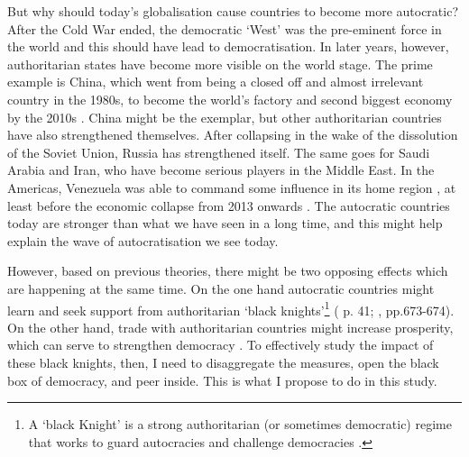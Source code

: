 But why should today's globalisation cause countries to become more autocratic? After the Cold War ended, the democratic `West' was the pre-eminent force in the world and this should have lead to democratisation. In later years, however, authoritarian states have become more visible on the world stage. The prime example is China, which went from being a closed off and almost irrelevant country in the 1980s, to become the world's factory and second biggest economy by the 2010s \citep{imf_world_2025}. China might be the exemplar, but other authoritarian countries have also strengthened themselves. After collapsing in the wake of the dissolution of the Soviet Union, Russia has strengthened itself. The same goes for Saudi Arabia and Iran, who have become serious players in the Middle East. In the Americas, Venezuela was able to command some influence in its home region \citep[p. 204]{mcconnell_elite_2024}, at least before the economic collapse from 2013 onwards \citep{imf_world_2025}. The autocratic countries today are stronger than what we have seen in a long time, and this might help explain the wave of autocratisation we see today.

However, based on previous theories, there might be two opposing effects which are happening at the same time. On the one hand autocratic countries might learn and seek support from authoritarian `black knights'\footnote{A `black Knight' is a strong authoritarian (or sometimes democratic) regime that works to guard autocracies and challenge democracies \cite[p. 676]{tolstrup_black_2014}.} (\citeauthor{levitsky_competitive_2010} \citeyear{levitsky_competitive_2010} p. 41; \citeauthor{tolstrup_black_2014} \citeyear{tolstrup_black_2014}, pp.673-674). On the other hand, trade with authoritarian countries might increase prosperity, which can serve to strengthen democracy \citep{lipset_social_1959, przeworski_modernization_1997}. To effectively study the impact of these black knights, then, I need to disaggregate the measures, open the black box of democracy, and peer inside. This is what I propose to do in this study.

